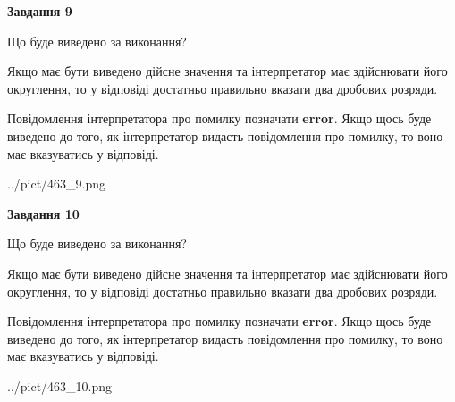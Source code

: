 \documentclass[12pt, ukrainian]{article}
\begin{document}
{\begin {Large}
{\begin {center}\textbf{Завдання 9}\end {center}}\par
Що буде виведено за виконання? \par

Якщо має бути виведено дійсне значення та інтерпретатор має здійснювати його округлення, 
то у відповіді достатньо правильно вказати два дробових розряди.

Повідомлення інтерпретатора про помилку позначати \textbf{error}.
Якщо щось буде виведено до того, як інтерпретатор видасть повідомлення про помилку, 
то воно має вказуватись у відповіді. \par

\begin{center}
	{../pict/463_9.png}
\end{center}
\newpage

{\begin {center}\textbf{Завдання 10}\end {center}}\par
Що буде виведено за виконання? \par

Якщо має бути виведено дійсне значення та інтерпретатор має здійснювати його округлення, 
то у відповіді достатньо правильно вказати два дробових розряди.

Повідомлення інтерпретатора про помилку позначати \textbf{error}.
Якщо щось буде виведено до того, як інтерпретатор видасть повідомлення про помилку, 
то воно має вказуватись у відповіді. \par

\begin{center}
	{../pict/463_10.png}
\end{center}
\newpage

\end {Large}}
\end{document}
